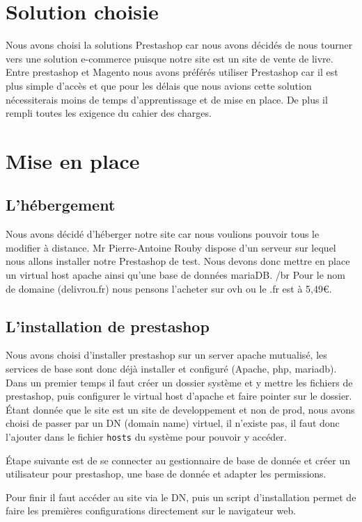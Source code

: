 \documentclass[a4paper,12pt]{report}
\begin{document}
\chapter{Solution choisie}
Nous avons choisi la solutions Prestashop car nous avons décidés de
nous tourner vers une solution e-commerce puisque notre site est un
site de vente de livre.  Entre prestashop et Magento nous avons
préférés utiliser Prestashop car il est plus simple d'accès et que
pour les délais que nous avions cette solution nécessiterais moins de
temps d'apprentissage et de mise en place. De plus il rempli toutes
les exigence du cahier des charges.

\chapter{Mise en place}
\section{L'hébergement}
Nous avons décidé d’héberger notre site car nous voulions pouvoir tous
le modifier à distance. Mr Pierre-Antoine Rouby dispose d'un serveur
sur lequel nous allons installer notre Prestashop de test. Nous devons
donc mettre en place un virtual host apache ainsi qu'une base de données
mariaDB. /br
Pour le nom de domaine (delivrou.fr) nous pensons l'acheter sur ovh ou
le .fr est à 5,49\euro.

\section{L'installation de prestashop}
Nous avons choisi d'installer prestashop sur un server apache mutualisé,
les services de base sont donc déjà installer et configuré (Apache, php,
mariadb).
Dans un premier temps il faut créer un dossier système et y mettre les
fichiers de prestashop, puis configurer le virtual host d'apache et faire
pointer sur le dossier. Étant donnée que le site est un site de
developpement et non de prod, nous avons choisi de passer par un DN (domain
name) virtuel, il n'existe pas, il faut donc l'ajouter dans le fichier
\texttt{hosts} du système pour pouvoir y accéder.

Étape suivante est de se connecter au gestionnaire de base de donnée et créer
un utilisateur pour prestashop, une base de donnée et adapter les permissions.

Pour finir il faut accéder au site via le DN, puis un script d'installation
permet de faire les premières configurations directement sur le navigateur
web.
\end{document}

